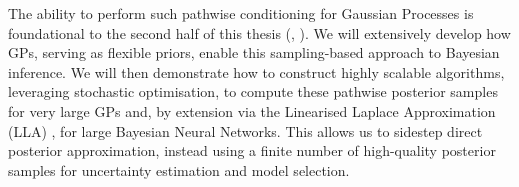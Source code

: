 The ability to perform such pathwise conditioning for Gaussian Processes is foundational to the second half of this thesis (, ). We will extensively develop how GPs, serving as flexible priors, enable this sampling-based approach to Bayesian inference. We will then demonstrate how to construct highly scalable algorithms, leveraging stochastic optimisation, to compute these pathwise posterior samples for very large GPs and, by extension via the Linearised Laplace Approximation (LLA) \parencite{mackay1992bayesian, immer2021improving}, for large Bayesian Neural Networks. This allows us to sidestep direct posterior approximation, instead using a finite number of high-quality posterior samples for uncertainty estimation and model selection.



